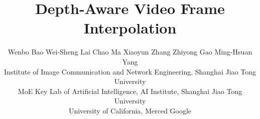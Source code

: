\documentclass[10pt,twocolumn,letterpaper]{article}
\begin{document}
	
\title{Depth-Aware Video Frame Interpolation\vspace{-3mm}}
	
	\author{
		{Wenbo Bao}
		\hspace{3pt}
		Wei-Sheng Lai
		\hspace{3pt}
		Chao Ma
		\hspace{3pt} 
		Xiaoyun Zhang
		\hspace{3pt}
		Zhiyong Gao
		\hspace{3pt}
		Ming-Hsuan Yang
		\\
		 Institute of Image Communication and Network Engineering, Shanghai Jiao Tong University \\
		 MoE Key Lab of Artificial Intelligence, AI
		Institute, Shanghai Jiao Tong University \\
 University of California, Merced
		\hspace{15pt}
		 Google
\vspace{-6mm}
	}
	
\end{document}
